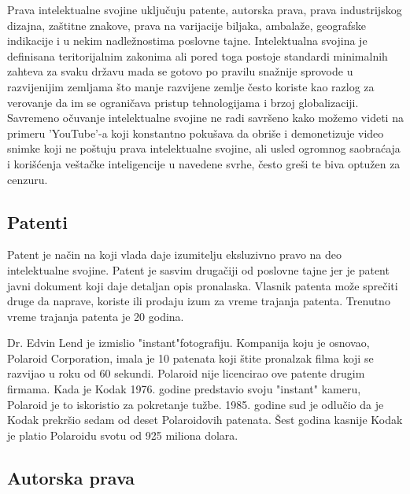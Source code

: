 \documentclass[a4paper]{article}
\begin{document}
Prava intelektualne svojine uključuju patente, autorska prava, prava industrijskog dizajna, zaštitne znakove, prava na varijacije biljaka, ambalaže, geografske indikacije i u nekim nadležnostima poslovne tajne. Intelektualna svojina je definisana
teritorijalnim zakonima ali pored toga postoje standardi minimalnih zahteva za
svaku državu mada se gotovo po pravilu snažnije sprovode u razvijenijim
zemljama što manje razvijene zemlje često koriste kao razlog za verovanje da im
se ograničava pristup tehnologijama i brzoj globalizaciji. Savremeno očuvanje
intelektualne svojine ne radi savršeno kako možemo videti na primeru 'YouTube'-a
koji konstantno pokušava da obriše i demonetizuje video snimke koji ne poštuju
prava intelektualne svojine, ali usled ogromnog saobraćaja i korišćenja veštačke inteligencije u navedene svrhe, često greši te biva optužen za cenzuru.

\subsection{Patenti}
\label{subsec:patenti}

Patent je način na koji vlada daje izumitelju eksluzivno pravo na deo intelektualne svojine. Patent je sasvim drugačiji od poslovne tajne jer je patent javni dokument koji daje detaljan opis pronalaska. Vlasnik patenta može sprečiti druge da naprave, koriste ili prodaju izum za vreme trajanja patenta. Trenutno vreme trajanja patenta je 20 godina.

Dr. Edvin Lend je izmislio "instant"\space fotografiju. Kompanija koju je osnovao, Polaroid Corporation, imala je 10 patenata koji štite pronalzak filma koji se razvijao u roku od 60 sekundi. Polaroid nije licencirao ove patente drugim firmama. Kada je Kodak 1976. godine predstavio svoju "instant" kameru, Polaroid je to iskoristio za pokretanje tužbe. 1985. godine sud je odlučio da je Kodak prekršio sedam od deset Polaroidovih patenata. Šest godina kasnije Kodak je platio Polaroidu svotu od 925 miliona dolara.

\subsection{Autorska prava}
\label{subsec:autorska}
\end{document}
